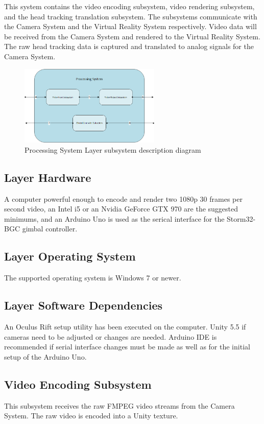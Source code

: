 This system contains the video encoding subsystem, video rendering subsystem, and the head tracking translation subsystem. The subsystems communicate with the Camera System and the Virtual Reality System respectively. Video data will be received from the Camera System and rendered to the Virtual Reality System. The raw head tracking data is captured and translated to analog signals for the Camera System.

\begin{figure}[h!]
	\centering
 	\includegraphics[width=0.60\textwidth]{images/processingsubsystem}
 \caption{Processing System Layer subsystem description diagram}
\end{figure}

\subsection{Layer Hardware}
A computer powerful enough to encode and render two 1080p 30 frames per second video, an Intel i5 or an Nvidia GeForce GTX 970 are the suggested minimums, and an Arduino Uno is used as the serical interface for the Storm32-BGC gimbal controller.

\subsection{Layer Operating System}
The supported operating system is Windows 7 or newer.

\subsection{Layer Software Dependencies}
An Oculus Rift setup utility has been executed on the computer. Unity 5.5 if cameras need to be adjusted or changes are needed. Arduino IDE is recommended if serial interface changes must be made as well as for the initial setup of the Arduino Uno.

\subsection{Video Encoding Subsystem}
This subsystem receives the raw FMPEG video streams from the Camera System. The raw video is encoded into a Unity texture.

